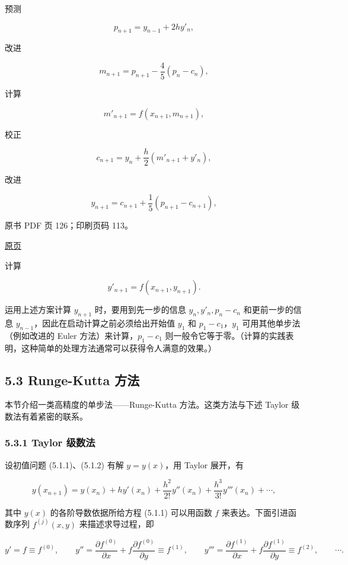 预测

\[
p_{n+1}=y_{n-1}+2hy'_n,
\]

改进

\[
m_{n+1}=p_{n+1}-\frac{4}{5}(p_n-c_n),
\]

计算

\[
m'_{n+1}=f(x_{n+1},m_{n+1}),
\]

校正

\[
c_{n+1}=y_n+\frac{h}{2}(m'_{n+1}+y'_n),
\]

改进

\[
y_{n+1}=c_{n+1}+\frac{1}{5}(p_{n+1}-c_{n+1}),
\]

\clearpage

原书 PDF 页 126；印刷页码 113。

\href{source-images/pdf-126.jpeg}{原页}

计算

\[
y'_{n+1}=f(x_{n+1},y_{n+1}).
\]

运用上述方案计算 \(y_{n+1}\) 时，要用到先一步的信息 \(y_n,y'_n,p_n-c_n\) 和更前一步的信息 \(y_{n-1}\)，因此在启动计算之前必须给出开始值 \(y_1\) 和 \(p_1-c_1\)，\(y_1\) 可用其他单步法（例如改进的 Euler 方法）来计算，\(p_1-c_1\) 则一般令它等于零。（计算的实践表明，这种简单的处理方法通常可以获得令人满意的效果。）

\subsection{5.3 Runge-Kutta 方法}\label{ch05a-runge-kutta-ux65b9ux6cd5}

本节介绍一类高精度的单步法------Runge-Kutta 方法。这类方法与下述 Taylor 级数法有着紧密的联系。

\subsubsection{5.3.1 Taylor 级数法}\label{ch05a-taylor-ux7ea7ux6570ux6cd5}

设初值问题 (5.1.1)、(5.1.2) 有解 \(y=y(x)\)，用 Taylor 展开，有

\[
y(x_{n+1})=y(x_n)+hy'(x_n)+\frac{h^2}{2!}y''(x_n)+\frac{h^3}{3!}y'''(x_n)+\cdots,\tag{5.3.1}
\]

其中 \(y(x)\) 的各阶导数依据所给方程 (5.1.1) 可以用函数 \(f\) 来表达。下面引进函数序列 \(f^{(j)}(x,y)\) 来描述求导过程，即

\[
y'=f\equiv f^{(0)},\qquad
y''=\frac{\partial f^{(0)}}{\partial x}+f\frac{\partial f^{(0)}}{\partial y}\equiv f^{(1)},\qquad
y'''=\frac{\partial f^{(1)}}{\partial x}+f\frac{\partial f^{(1)}}{\partial y}\equiv f^{(2)},\qquad\cdots.
\]

